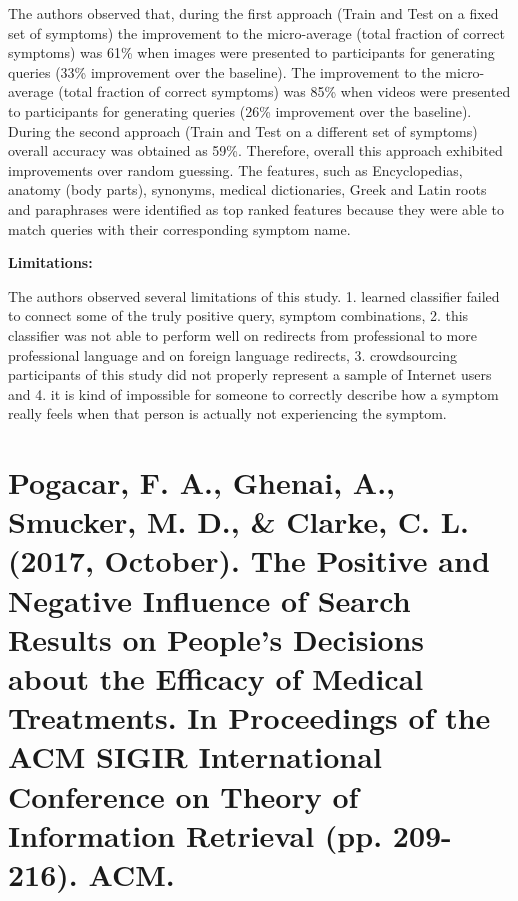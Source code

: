 \documentclass[]{article}
\begin{document}
The authors observed that, during the first approach (Train and Test on a fixed set of symptoms) the improvement to the micro-average (total fraction of correct symptoms) was 61\% when images were presented to participants for generating queries (33\% improvement over the baseline). The improvement to the micro-average (total fraction of correct symptoms) was 85\% when videos were presented to participants for generating queries (26\% improvement over the baseline). During the second approach (Train and Test on a different set of symptoms) overall accuracy was obtained as 59\%. Therefore, overall this approach exhibited improvements over random guessing. The features, such as Encyclopedias, anatomy (body parts), synonyms, medical dictionaries, Greek and Latin roots and paraphrases were identified as top ranked features because they were able to match queries with their corresponding symptom name. 

\textbf{Limitations:} 

The authors observed several limitations of this study. 1. learned classifier failed to connect some of the truly positive query, symptom combinations, 2. this classifier was not able to perform well on redirects from professional to more professional language and on foreign language redirects, 3. crowdsourcing participants of this study did not properly represent a sample of Internet users and 4. it is kind of impossible for someone to correctly describe how a symptom really feels when that person is actually not experiencing the symptom. 

\section{Pogacar, F. A., Ghenai, A., Smucker, M. D., \& Clarke, C. L. (2017, October). The Positive and Negative Influence of Search Results on People's Decisions about the Efficacy of Medical Treatments. In Proceedings of the ACM SIGIR International Conference on Theory of Information Retrieval (pp. 209-216). ACM.}
\end{document}
